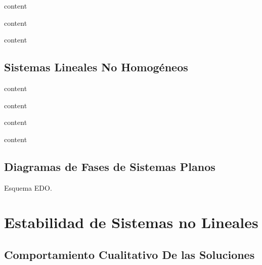 \begin{obs}
  content
\end{obs}

\begin{prop}
  content
\end{prop}

\begin{prop}
  content
\end{prop}

\section{Sistemas Lineales No Homogéneos}

\begin{obs}
  content
\end{obs}

\begin{defn}
  content
\end{defn}

\begin{prop}
  content
\end{prop}

\begin{prop}
  content
\end{prop}

\section{Diagramas de Fases de Sistemas Planos}

Esquema EDO.

\chapter{Estabilidad de Sistemas no Lineales}

\section{Comportamiento Cualitativo De las Soluciones}

